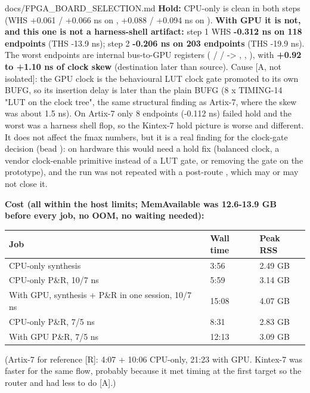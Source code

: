 \begin{relocated}{docs/FPGA_BOARD_SELECTION.md}
\textbf{Hold:} CPU-only is clean in both steps (WHS +0.061 / +0.066 ns
on , +0.088 / +0.094 ns on ). \textbf{With
GPU it is not, and this one is not a harness-shell artifact:} step 1
 WHS \textbf{-0.312 ns on 118 endpoints} (THS -13.9 ns);
step 2 \textbf{-0.206 ns on 203 endpoints} (THS -19.9 ns). The worst
endpoints are internal bus-to-GPU registers ( /
 /   -\textgreater{}
 , , ), with
\textbf{+0.92 to +1.10 ns of clock skew} (destination later than
source). Cause {[}A, not isolated{]}: the GPU clock is the behavioural
LUT clock gate promoted to its own BUFG, so its insertion delay is later
than the plain  BUFG (8 x TIMING-14 "LUT on the clock tree",
the same structural finding as Artix-7, where the skew was about 1.5
ns). On Artix-7 only 8 endpoints (-0.112 ns) failed hold and the worst
was a harness shell flop, so the Kintex-7 hold picture is worse and
different. It does not affect the fmax numbers, but it is a real finding
for the clock-gate decision (bead ): on hardware this would
need a hold fix (balanced clock, a vendor clock-enable primitive instead
of a LUT gate, or removing the gate on the prototype), and the run was
not repeated with a post-route , which may or may
not close it.

\textbf{Cost (all within the host limits; MemAvailable was 12.6-13.9 GB
before every job, no OOM, no waiting needed):}

{
\begin{longtable}[]{@{}lll@{}}
\toprule\noalign{}
Job & Wall time & Peak RSS \\
\midrule\noalign{}
\endhead
\bottomrule\noalign{}
\endlastfoot
CPU-only synthesis & 3:56 & 2.49 GB \\
CPU-only P\&R, 10/7 ns & 5:59 & 3.14 GB \\
With GPU, synthesis + P\&R in one session, 10/7 ns & 15:08 & 4.07 GB \\
CPU-only P\&R, 7/5 ns & 8:31 & 2.83 GB \\
With GPU P\&R, 7/5 ns & 12:13 & 3.09 GB \\
\end{longtable}
}

(Artix-7 for reference {[}R{]}: 4:07 + 10:06 CPU-only, 21:23 with GPU.
Kintex-7 was faster for the same flow, probably because it met timing at
the first target so the router and  had less to do
{[}A{]}.)


\end{relocated}
